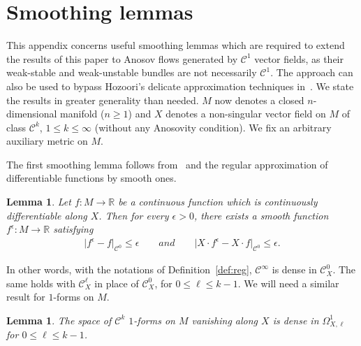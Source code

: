 \documentclass[letterpaper, 11pt]{article}
\numberwithin{equation}{section}
\newtheorem{lem}[thm]{Lemma}
\newcommand{\R}{\mathbb{R}}
\begin{document}
	\appendix
	\section{Smoothing lemmas} \label{appendixA}


This appendix concerns useful smoothing lemmas which are required to extend the results of this paper to Anosov flows generated by $\mathcal{C}^1$ vector fields, as their weak-stable and weak-unstable bundles are not necessarily $\mathcal{C}^1$. The approach can also be used to bypass Hozoori's delicate approximation techniques in~\cite[Section 4]{H22a}. We state the results in greater generality than needed. $M$ now denotes a closed $n$-dimensional manifold ($n \geq 1$) and $X$ denotes a non-singular vector field on $M$ of class $\mathcal{C}^k$, $1 \leq k \leq \infty$ (without any Anosovity condition). We fix an arbitrary auxiliary metric on $M$.

The first smoothing lemma follows from~\cite[Lemma 4.3]{H22a} and the regular approximation of differentiable functions by smooth ones.

\begin{lem} \label{lem:smooth1}
Let $f : M \rightarrow \R$ be a continuous function which is continuously differentiable along $X$. Then for every $\epsilon > 0$, there exists a smooth function $f^\epsilon : M \rightarrow \R$ satisfying
	\begin{align*}
	\vert f^\epsilon - f \vert_{\mathcal{C}^0} \leq \epsilon \qquad and \qquad \vert X \cdot f^\epsilon - X \cdot f \vert_{\mathcal{C}^0} \leq \epsilon.
	\end{align*}
\end{lem}

In other words, with the notations of Definition~\ref{def:reg}, $\mathcal{C}^\infty$ is dense in $\mathcal{C}^0_X$. The same holds with $\mathcal{C}^\ell_X$ in place of $\mathcal{C}^0_X$, for $0 \leq \ell \leq k-1$. We will need a similar result for $1$-forms on $M$.

\begin{lem} \label{lem:smooth2}
The space of $\mathcal{C}^k$ $1$-forms on $M$ vanishing along $X$ is dense in $\Omega_{X,\ell}^1$ for $0 \leq \ell \leq k-1$.
\end{lem}
\end{document}
